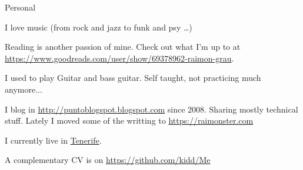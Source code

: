 \documentclass{resume} %
\begin{document}
\begin{rSection}{Personal}

\item I love music (from rock and jazz to funk and psy \ldots)
\item Reading is another passion of mine. Check out what I'm up to at
  \url{https://www.goodreads.com/user/show/69378962-raimon-grau}.
\item I used to play Guitar and bass guitar. Self taught, not
  practicing much anymore...
\item I blog in \url{http://puntoblogspot.blogspot.com} since
  2008. Sharing mostly technical stuff. Lately I moved some of the
  writting to \url{https://raimonster.com}
\item I currently live in
  \href{https://www.google.es/maps/place/Tenerife/@28.2925426,-17.0803948,9z/data=!3m1!4b1!4m2!3m1!1s0xc4029effe8682ed:0xb01a4bf1c84baf3c}{Tenerife}.
\item A complementary CV is on \href{https://github.com/kidd/Me}{https://github.com/kidd/Me}
\end{rSection}





\end{document}
